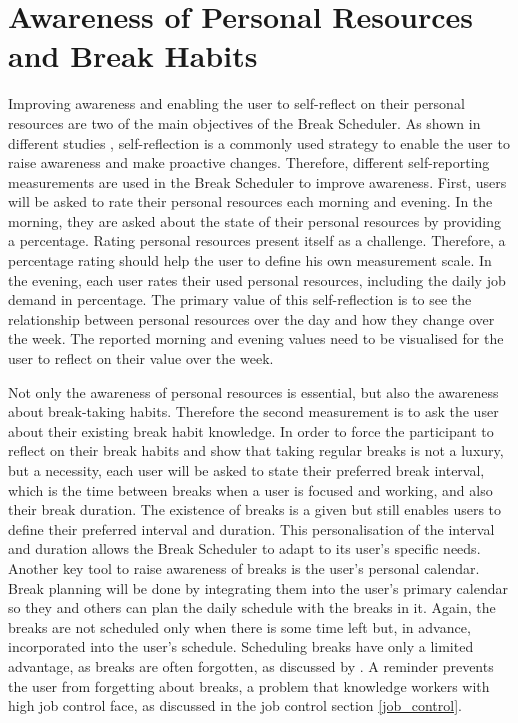 \documentclass{hasel_thesis}
\begin{document}
\section{Awareness of Personal Resources and Break Habits}
Improving awareness and enabling the user to self-reflect on their personal resources are two of the main objectives of the Break Scheduler. As shown in different studies \cite{GRANT20083}, self-reflection is a commonly used strategy to enable the user to raise awareness and make proactive changes. Therefore, different self-reporting measurements are used in the Break Scheduler to improve awareness. First, users will be asked to rate their personal resources each morning and evening. In the morning, they are asked about the state of their personal resources by providing a percentage. Rating personal resources present itself as a challenge. Therefore, a percentage rating should help the user to define his own measurement scale. In the evening, each user rates their used personal resources, including the daily job demand in percentage. The primary value of this self-reflection is to see the relationship between personal resources over the day and how they change over the week. The reported morning and evening values need to be visualised for the user to reflect on their value over the week.

Not only the awareness of personal resources is essential, but also the awareness about break-taking habits. Therefore the second measurement is to ask the user about their existing break habit knowledge. In order to force the participant to reflect on their break habits and show that taking regular breaks is not a luxury, but a necessity, each user will be asked to state their preferred break interval, which is the time between breaks when a user is focused and working, and also their break duration. The existence of breaks is a given but still enables users to define their preferred interval and duration. This personalisation of the interval and duration allows the Break Scheduler to adapt to its user's specific needs. Another key tool to raise awareness of breaks is the user's personal calendar. Break planning will be done by integrating them into the user's primary calendar so they and others can plan the daily schedule with the breaks in it. Again, the breaks are not scheduled only when there is some time left but, in advance, incorporated into the user's schedule. Scheduling breaks have only a limited advantage, as breaks are often forgotten, as discussed by \cite{McLean.2001}. A reminder prevents the user from forgetting about breaks, a problem that knowledge workers with high job control face, as discussed in the job control section \ref{job_control}.
\end{document}
